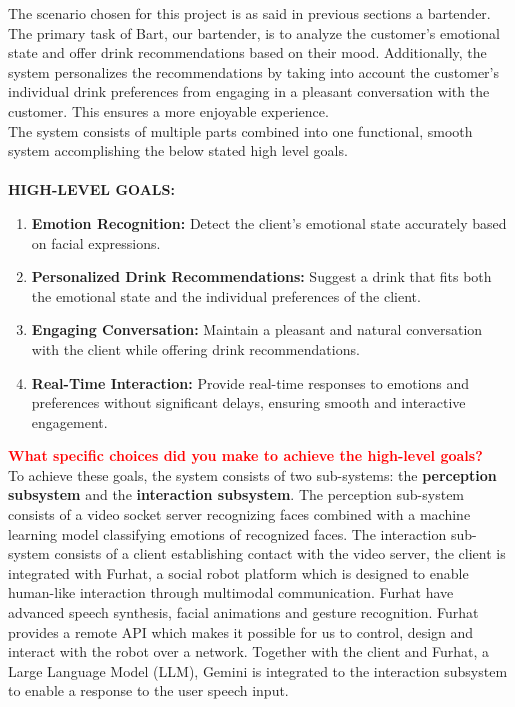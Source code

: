 \documentclass[conference]{IEEEtran}
\begin{document}
The scenario chosen for this project is as said in previous sections a bartender. The primary task of Bart, our bartender, is to analyze the customer's emotional state and offer drink recommendations based on their mood. Additionally, the system personalizes the recommendations by taking into account the customer's individual drink preferences from engaging in a pleasant conversation with the customer. This ensures a more enjoyable experience.\\The system consists of multiple parts combined into one functional, smooth system accomplishing the below stated high level goals.\\
\\
\textbf{HIGH-LEVEL GOALS:}
\\
\begin{enumerate}
    \item \textbf{Emotion Recognition:} Detect the client’s emotional state accurately based on facial expressions.
    \item \textbf{Personalized Drink Recommendations:} Suggest a drink that fits both the emotional state and the individual preferences of the client.
    \item \textbf{Engaging Conversation:} Maintain a pleasant and natural conversation with the client while offering drink recommendations.
    \item \textbf{Real-Time Interaction:} Provide real-time responses to emotions and preferences without significant delays, ensuring smooth and interactive engagement.
\\
\end{enumerate}

\textcolor{red}{\textbf{What specific choices did you make to achieve the high-level goals?}}
\\
To achieve these goals, the system consists of two sub-systems: the \textbf{perception subsystem} and the \textbf{interaction subsystem}. The perception sub-system consists of a video socket server recognizing faces combined with a machine learning model classifying emotions of recognized faces. The interaction sub-system consists of a client establishing contact with the video server, the client is integrated with Furhat, a social robot platform which is designed to enable human-like interaction through multimodal communication. Furhat have advanced speech synthesis, facial animations and gesture recognition. Furhat provides a remote API which makes it possible for us to control, design and interact with the robot over a network. Together with the client and Furhat, a Large Language Model (LLM), Gemini is integrated to the interaction subsystem to enable a response to the user speech input. 
\\
\\
\\
\end{document}
